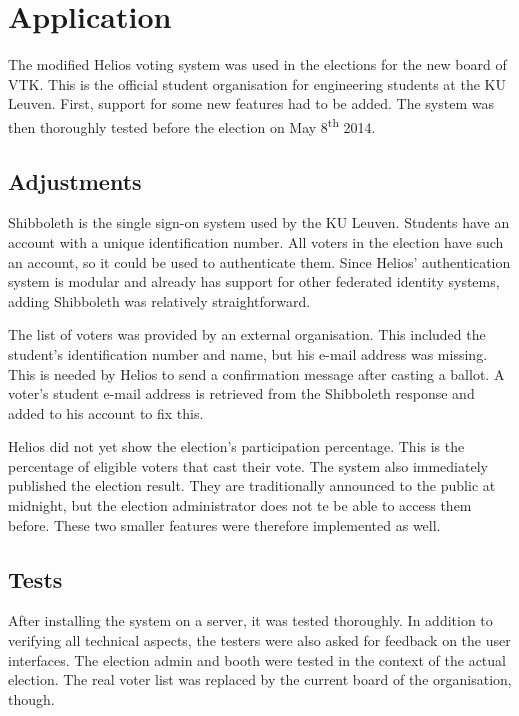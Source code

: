 % 
%

\section{Application}

The modified Helios voting system was used in the elections for the new board of VTK. This is the official student organisation for engineering students at the KU Leuven. First, support for some new features had to be added. The system was then thoroughly tested before the election on May 8\textsuperscript{th} 2014.

\subsection{Adjustments}

Shibboleth is the single sign-on system used by the KU Leuven. Students have an account with a unique identification number. All voters in the election have such an account, so it could be used to authenticate them. Since Helios' authentication system is modular and already has support for other federated identity systems, adding Shibboleth was relatively straightforward.

\par The list of voters was provided by an external organisation. This included the student's identification number and name, but his e-mail address was missing. This is needed by Helios to send a confirmation message after casting a ballot. A voter's student e-mail address is retrieved from the Shibboleth response and added to his account to fix this.

\par Helios did not yet show the election's participation percentage. This is the percentage of eligible voters that cast their vote. The system also immediately published the election result. They are traditionally announced to the public at midnight, but the election administrator does not te be able to access them before. These two smaller features were therefore implemented as well.

\subsection{Tests}

After installing the system on a server, it was tested thoroughly. In addition to verifying all technical aspects, the testers were also asked for feedback on the user interfaces. The election admin and booth were tested in the context of the actual election. The real voter list was replaced by the current board of the organisation, though.

